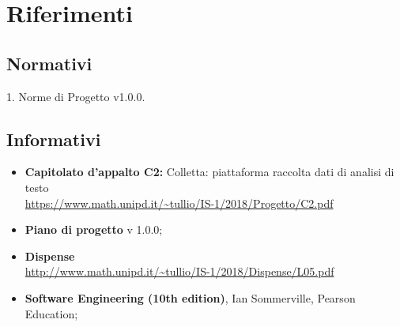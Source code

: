 \section{Riferimenti}

\subsection{Normativi}
1. Norme di Progetto v1.0.0.
\subsection{Informativi}
\begin{itemize}
\item \textbf{Capitolato d’appalto C2:} Colletta: piattaforma raccolta dati di analisi di testo\\
\url{https://www.math.unipd.it/~tullio/IS-1/2018/Progetto/C2.pdf}
\item \textbf{Piano di progetto} v 1.0.0;
\item \textbf{Dispense} \\
\url{http://www.math.unipd.it/~tullio/IS-1/2018/Dispense/L05.pdf}
\item \textbf{Software Engineering (10th edition)}, Ian Sommerville, Pearson Education;

\end{itemize}
